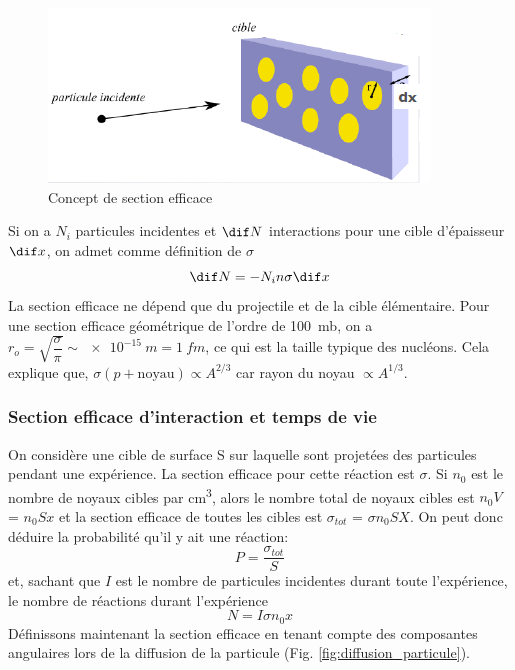 \begin{figure}[ht]
    \centering
    \includegraphics[scale=0.75]{Images1/section_efficace.PNG}
    \caption{Concept de section efficace}
    \label{fig:section_efficace}
\end{figure}
Si on a $N_i$ particules incidentes et $\dif N$ interactions pour une cible d'épaisseur $\dif x$, on admet comme définition de $\sigma$
\[
    \dif N=-N_in\sigma \dif x
\]
La section efficace ne dépend que du projectile et de la cible élémentaire. Pour une section efficace géométrique de l'ordre de \SI{100}{mb}, on a $r_o=\sqrt{\dfrac{\sigma}{\pi}}\sim \SI{e-15}{m} = \SI{1}{fm}$, ce qui est la taille typique des nucléons. Cela explique que, $\sigma(p+\text{noyau})\propto A^{2/3}$ car rayon du noyau $\propto A^{1/3}$.

\subsubsection{Section efficace d'interaction et temps de vie}
On considère une cible de surface S sur laquelle sont projetées des particules pendant une expérience. La section efficace pour cette réaction est $\sigma$. Si $n_0$ est le nombre de noyaux cibles par \si{cm^3}, alors le nombre total de noyaux cibles est $n_0 V$ = $n_0 S x$ et la section efficace de toutes les cibles est $\sigma_{tot}$ = $\sigma n_0 S X$. On peut donc déduire la probabilité qu'il y ait une réaction:
\[
    P=\dfrac{\sigma_{tot}}{S}
\]
et, sachant que $I$ est le nombre de particules incidentes durant toute l'expérience, le nombre de réactions durant l'expérience
\[
    N=I \sigma n_0 x
\]
Définissons maintenant la section efficace en tenant compte des composantes angulaires lors de la diffusion de la particule (Fig. \ref{fig:diffusion_particule}).

